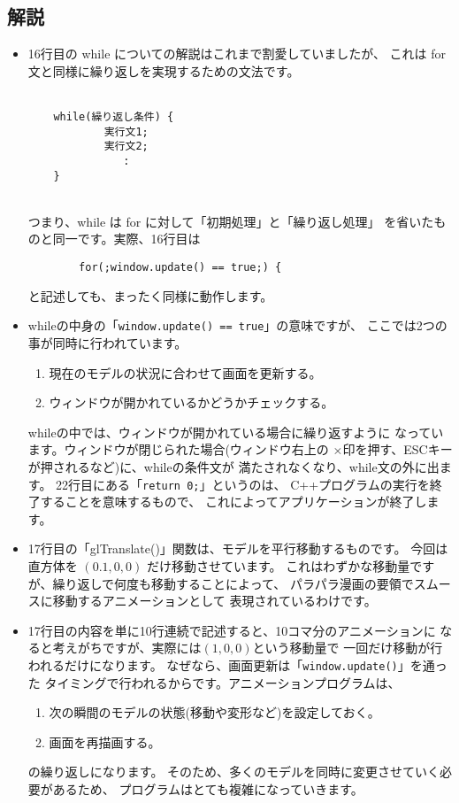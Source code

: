 \subsection*{解説}
\begin{itemize}
 \item 16行目の while についての解説はこれまで割愛していましたが、
	これは for 文と同様に繰り返しを実現するための文法です。\\ ~ \\
	\begin{shadebox}
	\begin{verbatim}
	while(繰り返し条件) {
	        実行文1;
	        実行文2;
	           :
	}
	\end{verbatim}
	\end{shadebox} ~ \\
	つまり、while は for に対して「初期処理」と「繰り返し処理」
	を省いたものと同一です。実際、16行目は
	\begin{screen}
	\begin{verbatim}
	    for(;window.update() == true;) {
	\end{verbatim}
	\end{screen}
	と記述しても、まったく同様に動作します。

 \item whileの中身の「\verb+window.update() == true+」の意味ですが、
	ここでは2つの事が同時に行われています。
	\begin{enumerate}
	 \item 現在のモデルの状況に合わせて画面を更新する。
	 \item ウィンドウが開かれているかどうかチェックする。
	\end{enumerate}
	whileの中では、ウィンドウが開かれている場合に繰り返すように
	なっています。ウィンドウが閉じられた場合(ウィンドウ右上の
	×印を押す、ESCキーが押されるなど)に、whileの条件文が
	満たされなくなり、while文の外に出ます。
	22行目にある「\verb+return 0;+」というのは、
	C++プログラムの実行を終了することを意味するもので、
	これによってアプリケーションが終了します。

 \item 17行目の「glTranslate()」関数は、モデルを平行移動するものです。
	今回は直方体を \((0.1, 0, 0)\) だけ移動させています。
	これはわずかな移動量ですが、繰り返しで何度も移動することによって、
	パラパラ漫画の要領でスムースに移動するアニメーションとして
	表現されているわけです。

 \item 17行目の内容を単に10行連続で記述すると、10コマ分のアニメーションに
	なると考えがちですが、実際には\((1, 0, 0)\)という移動量で
	一回だけ移動が行われるだけになります。
	なぜなら、画面更新は「\verb+window.update()+」を通った
	タイミングで行われるからです。アニメーションプログラムは、
	\begin{enumerate}
	 \item 次の瞬間のモデルの状態(移動や変形など)を設定しておく。
	 \item 画面を再描画する。
	\end{enumerate}
	の繰り返しになります。
	そのため、多くのモデルを同時に変更させていく必要があるため、
	プログラムはとても複雑になっていきます。
\end{itemize}

